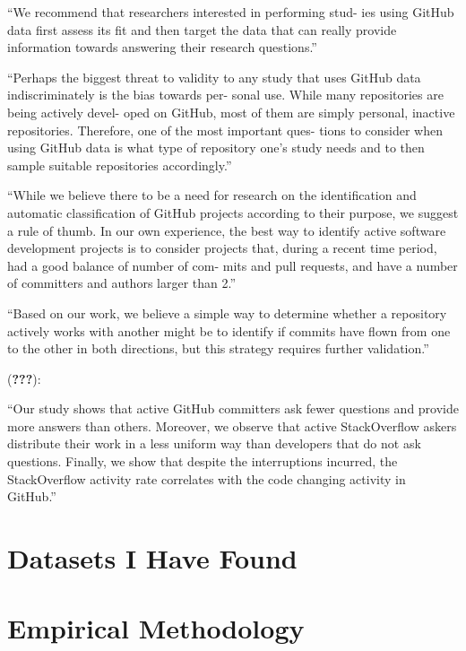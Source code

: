 \documentclass[11pt,preprint, authoryear]{article}
\numberwithin{equation}{section}
\numberwithin{figure}{section}
\numberwithin{table}{section}
\begin{document}
``We recommend that researchers interested in performing stud- ies using
GitHub data first assess its fit and then target the data that can
really provide information towards answering their research questions.''

``Perhaps the biggest threat to validity to any study that uses GitHub
data indiscriminately is the bias towards per- sonal use. While many
repositories are being actively devel- oped on GitHub, most of them are
simply personal, inactive repositories. Therefore, one of the most
important ques- tions to consider when using GitHub data is what type of
repository one's study needs and to then sample suitable repositories
accordingly.''

``While we believe there to be a need for research on the identification
and automatic classification of GitHub projects according to their
purpose, we suggest a rule of thumb. In our own experience, the best way
to identify active software development projects is to consider projects
that, during a recent time period, had a good balance of number of com-
mits and pull requests, and have a number of committers and authors
larger than 2.''

``Based on our work, we believe a simple way to determine whether a
repository actively works with another might be to identify if commits
have flown from one to the other in both directions, but this strategy
requires further validation.''

({\textbf{???}}):

``Our study shows that active GitHub committers ask fewer questions and
provide more answers than others. Moreover, we observe that active
StackOverflow askers distribute their work in a less uniform way than
developers that do not ask questions. Finally, we show that despite the
interruptions incurred, the StackOverflow activity rate correlates with
the code changing activity in GitHub.''

\newpage

\section{\texorpdfstring{Datasets I Have Found
\label{Data}}{Datasets I Have Found }}\label{datasets-i-have-found}

\newpage

\section{\texorpdfstring{Empirical Methodology
\label{Meth}}{Empirical Methodology }}\label{empirical-methodology}
\end{document}
